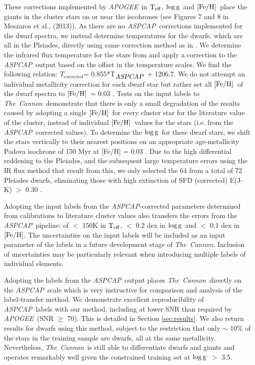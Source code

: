 \documentclass[12pt, preprint]{aastex}
\newcommand{\teff}{\mbox{$\rm T_{eff}$}}
\newcommand{\feh}{\mbox{$\rm [Fe/H]$}}
\newcommand{\logg}{\mbox{$\rm \log g$}}
\newcommand{\tc}{\textsl{The~Cannon}}
\newcommand{\apogee}{\textsl{APOGEE}}
\newcommand{\aspcap}{\textsl{ASPCAP}}
\begin{document}
These corrections implemented by \apogee\ in \teff, \logg\ and  \feh\ place the giants in the cluster stars on or near the iscohrones (see Figures 7 and 8 in Meszaros et al., (2013)).  As there are no \aspcap\ corrections implemented for the dwarf spectra, we instead determine temperatures for the dwarfs, which are all in the Pleiades, directly using same correction method as in \citet{Meszaros2013}. We determine the infrared flux temperature for the stars from \citet{gonzalez2009} and apply a correction to the \aspcap\ output based on the offset in the temperature scales. We find the following relation: $T_{\mbox{corrected}}$= 0.855*T$_{\mbox{\textit{\aspcap}}}$ + 1206.7. We do not attempt an individual metallicity correction for each dwarf star but rather set all \feh\ of the dwarf spectra to \feh\ = 0.03 \citep{barrado2001}. Tests on the input labels to \tc\ demonstrate that there is only a small degradation of the results caused by adopting a single \feh\ for every cluster star for the literature value of the cluster, instead of individual \feh\ values for the stars (i.e. from the \aspcap\ corrected values). To determine the \logg\ for these dwarf stars, we shift the stars vertically to their nearest positions on an appropriate age-metallicity Padova isochrone of 150 Myr at [Fe/H] = 0.03 \citep{girardi2000}. Due to the high differential reddening to the Pleiades, and the subsequent large temperature errors using the IR flux method that result from this, we only selected the 64 from a total of 72 Pleiades dwarfs, eliminating those with high extinction of SFD (corrected) E(J-K) $>$ 0.30 \citep{Schlafly2011}.

Adopting the input labels from the \aspcap-corrected parameters determined from calibrations to literature cluster values also transfers the errors from the \aspcap\ pipeline: of $<$ 150K in \teff,  $<$ 0.2 dex in \logg\ and $<$ 0.1 dex in \feh.   The uncertainties on the input labels will be included as an input parameter of the labels in a future development stage of \tc. Inclusion of uncertainties may be particularly relevant when introducing multiple labels of individual elements. 

Adopting the labels from the \aspcap\ output places \tc\ directly on the \aspcap\ scale which is very instructive for comparison and analysis of the label-transfer method. We demonstrate excellent reproducibility of \aspcap\ labels with our method, including at lower SNR than required by \apogee\ (SNR $\ge$ 70). This is detailed in Section \ref{sec:results}. We also return results for dwarfs using this method, subject to the restriction that only $\sim$ 10\% of the stars in the training sample are dwarfs, all at the same metallicity. Nevertheless, \tc\ is still able to differentiate dwarfs and giants and operates remarkably well given the constrained training set at \logg\ $>$ 3.5. 
\end{document}
